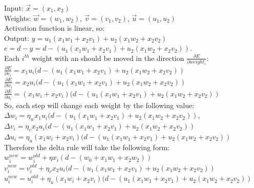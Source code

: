 \documentclass[a4paper, 12pt]{article}
\begin{document}
Input: 	$\vec{x} = (x_1, x_2)$\\
Weights: 	$\vec{w} = (w_1, w_2)$, $\vec{v} = (v_1, v_2)$, $\vec{u} = (u_1, u_2)$\\
Activation function is linear, so:\\
Output: $y = u_1(x_1w_1 + x_2v_1) + u_2(x_1w_2 + x_2v_2)$\\

$e = d - y = d - (u_1(x_1w_1 + x_2v_1) + u_2(x_1w_2 + x_2v_2))$.\\

Each $i^{th}$ weight with an should be moved in the direction $\frac{\partial E}{\partial weight_i}$:\\

$\frac{\partial E}{\partial v_i} = x_1u_i(d - (u_1(x_1w_1 + x_2v_1) + u_2(x_1w_2 + x_2v_2))$\\

$\frac{\partial E}{\partial w_i} = x_2u_i(d - (u_1(x_1w_1 + x_2v_1) + u_2(x_1w_2 + x_2v_2))$\\

$\frac{\partial E}{\partial u_i} = (x_1w_i + x_2v_i)(d - (u_1(x_1w_1 + x_2v_1) + u_2(x_1w_2 + x_2v_2))$\\

So, each step will change each weight by the following value:\\

$\Delta w_i = \eta_w x_1u_i(d - (u_1(x_1w_1 + x_2v_1) + u_2(x_1w_2 + x_2v_2))$,\\
$\Delta v_i = \eta_v x_2u_i(d - (u_1(x_1w_1 + x_2v_1) + u_2(x_1w_2 + x_2v_2))$\\
$\Delta u_i = \eta_u (x_1w_i + x_2v_i)(d - (u_1(x_1w_1 + x_2v_1) + u_2(x_1w_2 + x_2v_2))$\\

Therefore the delta rule will take the following form:\\

$w_i^{new} = w_i^{old} + \eta x_i(d - (w_0 + x_1w_1 + x_2w_2))$\\
$v_i^{new} = v_i^{old} + \eta_v x_2u_i(d - (u_1(x_1w_1 + x_2v_1) + u_2(x_1w_2 + x_2v_2))$\\
$u_i^{new} = u_i^{old} + \eta_u (x_1w_i + x_2v_i)(d - (u_1(x_1w_1 + x_2v_1) + u_2(x_1w_2 + x_2v_2))$\\
\end{document}
